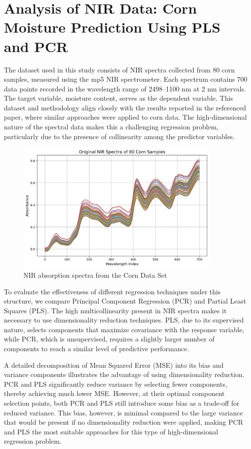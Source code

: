 \documentclass[11pt,twoside,a4paper]{article}
\begin{document}
\section{Analysis of NIR Data: Corn Moisture Prediction Using PLS and PCR}

The dataset used in this study consists of NIR spectra collected from 80 corn samples, measured using the mp5 NIR spectrometer. Each spectrum contains 700 data points recorded in the wavelength range of 2498–1100 nm at 2 nm intervals. The target variable, moisture content, serves as the dependent variable. This dataset and methodology align closely with the results reported in the referenced paper, where similar approaches were applied to corn data. The high-dimensional nature of the spectral data makes this a challenging regression problem, particularly due to the presence of collinearity among the predictor variables.

\begin{figure}[H]
    \centering
    \includegraphics[width=0.9\textwidth]{NIR_first_plot.png}
    \caption{NIR absorption spectra from the Corn Data Set}
    \label{fig:NIR_analysis}
\end{figure}

To evaluate the effectiveness of different regression techniques under this structure, we compare Principal Component Regression (PCR) and Partial Least Squares (PLS). The high multicollinearity present in NIR spectra makes it necessary to use dimensionality reduction techniques. PLS, due to its supervised nature, selects components that maximize covariance with the response variable, while PCR, which is unsupervised, requires a slightly larger number of components to reach a similar level of predictive performance.

A detailed decomposition of Mean Squared Error (MSE) into its bias and variance components illustrates the advantage of using dimensionality reduction. PCR and PLS significantly reduce variance by selecting fewer components, thereby achieving much lower MSE. However, at their optimal component selection points, both PCR and PLS still introduce some bias as a trade-off for reduced variance. This bias, however, is minimal compared to the large variance that would be present if no dimensionality reduction were applied, making PCR and PLS the most suitable approaches for this type of high-dimensional regression problem.
\end{document}
